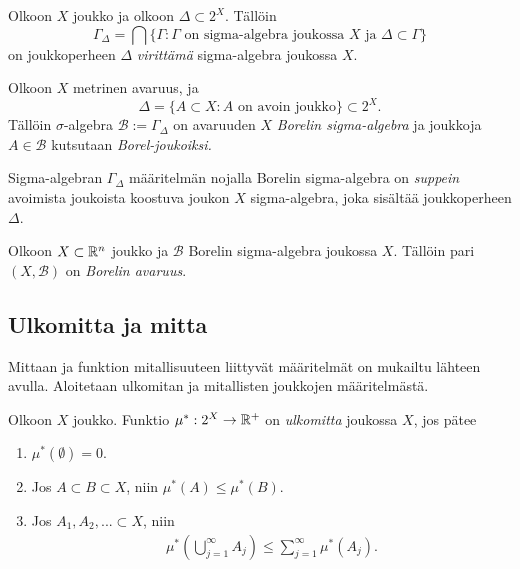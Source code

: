 \documentclass[12pt,oneside,a4paper]{amsbook} %
\begin{document}
\begin{definition}
    Olkoon $X$ joukko ja olkoon $\Delta \subset 2^X$. Tällöin 
        $$ \Gamma_\Delta = \bigcap \{\Gamma : \Gamma \text{ on sigma-algebra joukossa } X \text{ ja }  \Delta \subset \Gamma \}$$ 
    on joukkoperheen $\Delta$ \textit{virittämä} sigma-algebra joukossa $X$.
\end{definition}

\begin{definition}
    Olkoon $X$ metrinen avaruus, ja 
    \[\Delta = \{A \subset X : A \text{ on avoin joukko}\} \subset 2^X. \]
    Tällöin $\sigma$-algebra $\mathcal B := \Gamma_\Delta$ on avaruuden $X$ \textit{Borelin sigma-algebra} ja joukkoja $A\in \mathcal B$ kutsutaan \textit{Borel-joukoiksi.} 
\end{definition}

Sigma-algebran $\Gamma_\Delta$ määritelmän nojalla Borelin sigma-algebra on \textit{suppein} avoimista joukoista koostuva joukon $X$ sigma-algebra, joka sisältää joukkoperheen $\Delta$. 

\begin{definition}
    Olkoon $X\subset \mathbb{R}^n$ joukko ja $\mathcal{B}$ Borelin sigma-algebra joukossa $X$. Tällöin pari $(X, \mathcal{B})$ on \textit{Borelin avaruus}.
\end{definition}

\subsection{Ulkomitta ja mitta}
Mittaan ja funktion mitallisuuteen liittyvät määritelmät on mukailtu lähteen \cite[s. 88-110]{lehrbäck} avulla. Aloitetaan ulkomitan ja mitallisten joukkojen määritelmästä.
\begin{definition}
    Olkoon $X$ joukko. Funktio $\mu^*: 2^X \to {\mathbb{R}^{+}}$ on \textit{ulkomitta} joukossa $X$, jos pätee
    \begin{enumerate}
        \item $\mu^*(\emptyset) = 0.$
        \item Jos $A \subset B \subset X$, niin $\mu^*(A) \le \mu^*(B)$.
        \item Jos $A_1, A_2, ... \subset X$, niin 
        \begin{align*}
            \mu^*\left(\bigcup_{j=1}^\infty A_j \right) \le \sum_{j = 1}^\infty\mu^*(A_j).
        \end{align*}
    \end{enumerate}
\end{definition}
\end{document}
